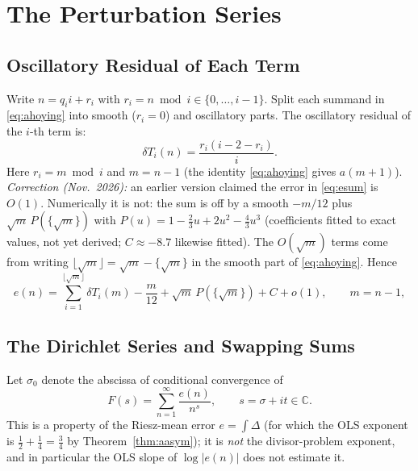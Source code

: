 \documentclass[12pt]{article}
\theoremstyle{definition}
\begin{document}
\section{The Perturbation Series}

\subsection{Oscillatory Residual of Each Term}

Write $n = q_i i + r_i$ with $r_i = n \bmod i \in \{0,\ldots,i-1\}$.
Split each summand in \eqref{eq:ahoying} into smooth ($r_i = 0$) and
oscillatory parts.  The oscillatory residual of the $i$-th term is:
\begin{equation}
    \delta T_i(n) = \frac{r_i(i - 2 - r_i)}{i}.
    \label{eq:dT}
\end{equation}
Here $r_i=m \bmod i$ and $m=n-1$ (the identity \eqref{eq:ahoying} gives $a(m+1)$).
\emph{Correction (Nov.\ 2026):} an earlier version claimed the error in \eqref{eq:esum} is $O(1)$.
Numerically it is not: the sum is off by a smooth $-m/12$ plus
$\sqrt m\,P(\{\sqrt m\})$ with $P(u)=1-\tfrac23u+2u^2-\tfrac43u^3$ (coefficients fitted to exact
values, not yet derived; $C\approx-8.7$ likewise fitted). The $O(\sqrt m)$ terms come from writing
$\lfloor\sqrt m\rfloor=\sqrt m-\{\sqrt m\}$ in the smooth part of \eqref{eq:ahoying}.
Hence
\begin{equation}
    e(n) = \sum_{i=1}^{\lfloor\sqrt{m}\rfloor} \delta T_i(m)
           - \frac{m}{12} + \sqrt{m}\,P(\{\sqrt{m}\}) + C + o(1),
    \qquad m=n-1,
    \label{eq:esum}
\end{equation}

\subsection{The Dirichlet Series and Swapping Sums}

Let $\sigma_0$ denote the abscissa of conditional convergence of
\begin{equation}
    F(s) = \sum_{n=1}^\infty \frac{e(n)}{n^s},
    \qquad s = \sigma + it \in \mathbb{C}.
    \label{eq:Fs}
\end{equation}
This is a property of the Riesz-mean error $e=\int\Delta$ (for which the OLS exponent is
$\tfrac12+\tfrac14=\tfrac34$ by Theorem~\ref{thm:aasym}); it is \emph{not} the
divisor-problem exponent, and in particular the OLS slope of $\log|e(n)|$ does not estimate it.
\end{document}
